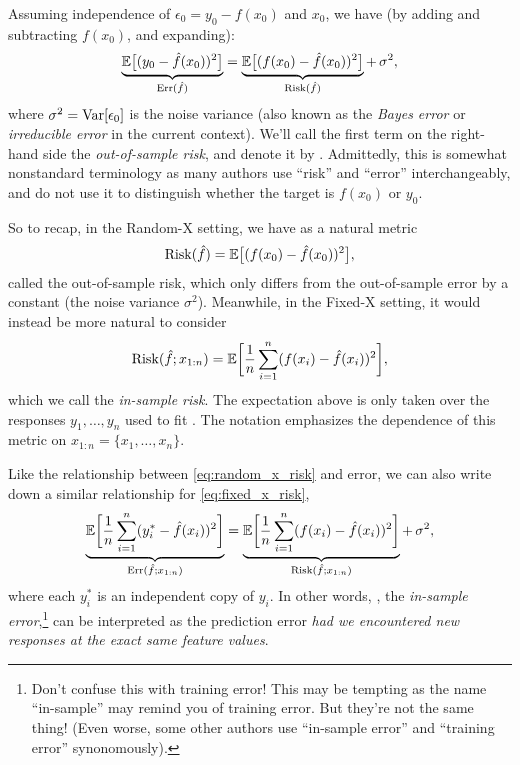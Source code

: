 \documentclass{article}
\begin{document}
Assuming independence of $\epsilon_0 = y_0 - f(x_0)$ and $x_0$, we have (by
adding and subtracting $f(x_0)$, and expanding): 
\[
\underbrace{\mathbb{E}\big[ (y_0 - \hat{f}(x_0))^2 \big]}_{\mathrm{Err}(\hat{f})} =
\underbrace{\mathbb{E}\big[ (f(x_0) - \hat{f}(x_0))^2 \big]}_{\mathrm{Risk}(\hat{f})} +\, \sigma^2,
\]
where $\sigma^2 = \mathrm{Var}[\epsilon_0]$ is the noise variance (also known as the 
\emph{Bayes error} or \emph{irreducible error} in the current context). We'll 
call the first term on the right-hand side the \emph{out-of-sample risk}, and
denote it by \smash{$\Risk(\hf)$}. Admittedly, this is somewhat nonstandard
terminology as many authors use ``risk'' and ``error''
interchangeably, and do not use it to distinguish whether the target is $f(x_0)$
or $y_0$.%

So to recap, in the Random-X setting, we have as a natural metric  
\begin{equation}
\label{eq:random_x_risk}
\mathrm{Risk}(\hat{f}) = \mathbb{E}\big[ (f(x_0) - \hat{f}(x_0))^2 \big],
\end{equation}
called the out-of-sample risk, which only differs from the out-of-sample error
by a constant (the noise variance $\sigma^2$). Meanwhile, in the Fixed-X
setting, it would instead be more natural to consider     
\begin{equation}
\label{eq:fixed_x_risk}
\mathrm{Risk}(\hat{f}; x_{1:n}) = \mathbb{E}\bigg[ \frac{1}{n}\sum_{i=1}^n (f(x_i) - \hat{f}(x_i))^2
\bigg], 
\end{equation}
which we call the \emph{in-sample risk}. The expectation above is only taken
over the responses $y_1,\dots,y_n$ used to fit \smash{$\hf$}. The notation 
 emphasizes the dependence of this metric on
$x_{1:n} = \{x_1,\dots,x_n\}$.   

Like the relationship between \eqref{eq:random_x_risk} and error, we can also
write down a similar relationship for \eqref{eq:fixed_x_risk},  
\[
\underbrace{\mathbb{E}\bigg[ \frac{1}{n}\sum_{i=1}^n (y_i^* - \hat{f}(x_i))^2 
  \bigg]}_{\mathrm{Err}(\hat{f}; x_{1:n})} =   
\underbrace{\mathbb{E}\bigg[ \frac{1}{n}\sum_{i=1}^n (f(x_i) - \hat{f}(x_i))^2
  \bigg]}_{\mathrm{Risk}(\hat{f};  x_{1:n})} +\, \sigma^2, 
\]
where each $y_i^*$ is an independent copy of $y_i$. In other words,
, the \emph{in-sample error},\footnote{Don't confuse
  this with training error! This may be tempting as the name ``in-sample'' may
  remind you of training error. But they're not the same thing! (Even worse,
  some other authors use ``in-sample error'' and ``training error''
  synonomously).}   
can be interpreted as the prediction error \emph{had we encountered new
  responses at the exact same feature values}. 
\end{document}
